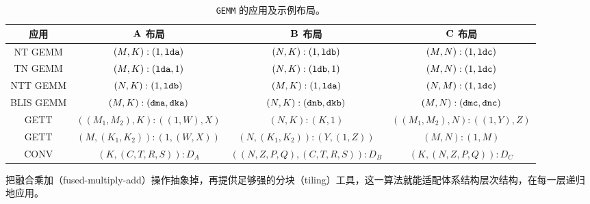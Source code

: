 \begin{table}[ht]
\centering
{\small
\begin{tabular}{|c|c|c|c|}
\textbf{应用} & $\mathbf{A}$ \textbf{布局} & $\mathbf{B}$ \textbf{布局} & $\mathbf{C}$ \textbf{布局} \\ \hline\hline
NT GEMM & $(M,K):(1,{\tt lda})$ & $(N,K):(1,{\tt ldb})$ & $(M,N):(1,{\tt ldc})$ \\ \hline
TN GEMM & $(M,K):({\tt lda},1)$ & $(N,K):({\tt ldb},1)$ & $(M,N):(1,{\tt ldc})$ \\ \hline
NTT GEMM & $(N,K):(1,{\tt ldb})$ & $(M,K):(1,{\tt lda})$ & $(N,M):(1,{\tt ldc})$ \\ \hline
BLIS GEMM & $(M,K):({\tt dma},{\tt dka})$ & $(N,K):({\tt dnb},{\tt dkb})$ & $(M,N):({\tt dmc},{\tt dnc})$ \\ \hline
GETT & $((M_1,M_2),K):((1,W),X)$ & $(N,K):(K,1)$ & $((M_1,M_2),N):((1,Y),Z)$ \\ \hline
GETT & $(M,(K_1,K_2)):(1,(W,X))$ & $(N,(K_1,K_2)):(Y,(1,Z))$ & $(M,N):(1,M)$ \\ \hline
CONV & $(K,(C,T,R,S)):D_A$ & $((N,Z,P,Q),(C,T,R,S)):D_B$ & $(K,(N,Z,P,Q)):D_C$ \\ \hline
\end{tabular}
\caption{{\tt GEMM} 的应用及示例布局。}
\label{tab:gemm}
}
\end{table}

把融合乘加（fused-multiply-add）操作抽象掉，再提供足够强的分块（tiling）工具，这一算法就能适配体系结构层次结构，在每一层递归地应用。

